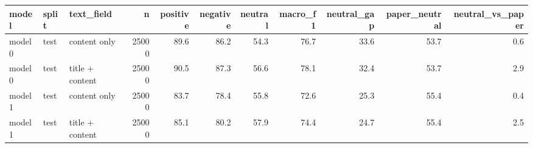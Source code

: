 \begin{tabular}{lllrrrrrrrr}
\toprule
 model & split &      text\_field &     n &  positive &  negative &  neutral &  macro\_f1 &  neutral\_gap &  paper\_neutral &  neutral\_vs\_paper \\
\midrule
model0 &  test &    content only & 25000 &      89.6 &      86.2 &     54.3 &      76.7 &         33.6 &           53.7 &               0.6 \\
model0 &  test & title + content & 25000 &      90.5 &      87.3 &     56.6 &      78.1 &         32.4 &           53.7 &               2.9 \\
model1 &  test &    content only & 25000 &      83.7 &      78.4 &     55.8 &      72.6 &         25.3 &           55.4 &               0.4 \\
model1 &  test & title + content & 25000 &      85.1 &      80.2 &     57.9 &      74.4 &         24.7 &           55.4 &               2.5 \\
\bottomrule
\end{tabular}
